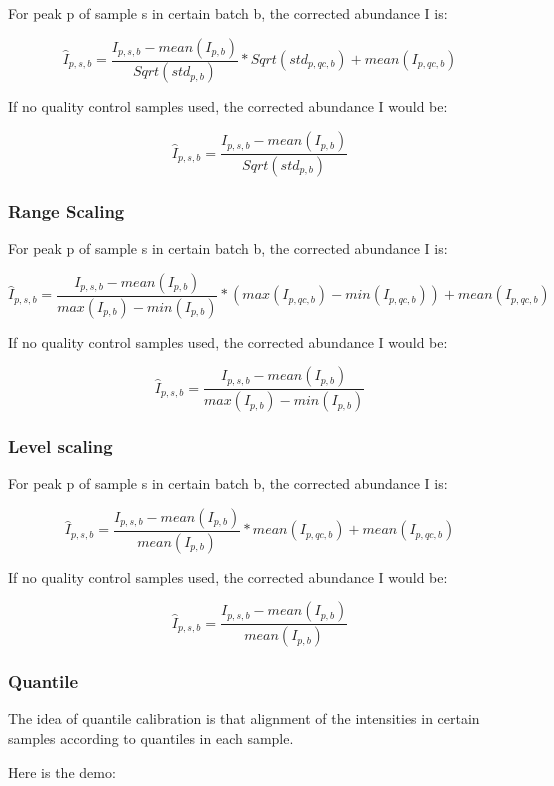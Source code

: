 \documentclass[
]{book}
\begin{document}
For peak p of sample s in certain batch b, the corrected abundance I is:

\[\hat I_{p,s,b} = \frac{I_{p,s,b} - mean(I_{p,b})}{Sqrt(std_{p,b})} * Sqrt(std_{p,qc,b}) + mean(I_{p,qc,b})\]

If no quality control samples used, the corrected abundance I would be:

\[\hat I_{p,s,b} = \frac{I_{p,s,b} - mean(I_{p,b})}{Sqrt(std_{p,b})}\]

\hypertarget{range-scaling}{%
\subsubsection{Range Scaling}\label{range-scaling}}

For peak p of sample s in certain batch b, the corrected abundance I is:

\[\hat I_{p,s,b} = \frac{I_{p,s,b} - mean(I_{p,b})}{max(I_{p,b}) - min(I_{p,b})} * (max(I_{p,qc,b}) - min(I_{p,qc,b})) + mean(I_{p,qc,b})\]

If no quality control samples used, the corrected abundance I would be:

\[\hat I_{p,s,b} = \frac{I_{p,s,b} - mean(I_{p,b})}{max(I_{p,b}) - min(I_{p,b})} \]

\hypertarget{level-scaling}{%
\subsubsection{Level scaling}\label{level-scaling}}

For peak p of sample s in certain batch b, the corrected abundance I is:

\[\hat I_{p,s,b} = \frac{I_{p,s,b} - mean(I_{p,b})}{mean(I_{p,b})} * mean(I_{p,qc,b}) + mean(I_{p,qc,b})\]

If no quality control samples used, the corrected abundance I would be:

\[\hat I_{p,s,b} = \frac{I_{p,s,b} - mean(I_{p,b})}{mean(I_{p,b})} \]

\hypertarget{quantile}{%
\subsubsection{Quantile}\label{quantile}}

The idea of quantile calibration is that alignment of the intensities in certain samples according to quantiles in each sample.

Here is the demo:
\end{document}
